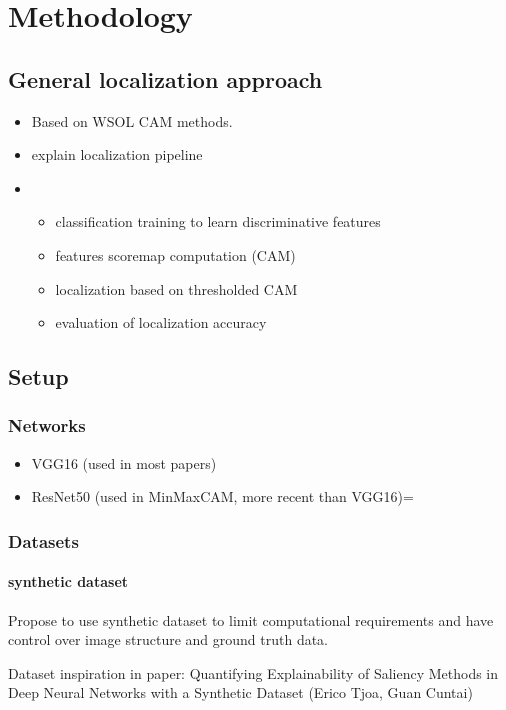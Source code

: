 \chapter{Methodology}

\section{General localization approach}
\begin{itemize}
    \item Based on WSOL CAM methods.
    \item explain localization pipeline
    \item  \begin{itemize}
        \item classification training to learn discriminative features
        \item features scoremap computation (CAM)
        \item localization based on thresholded CAM
        \item evaluation of localization accuracy 
    \end{itemize}
\end{itemize}

\section{Setup}

\subsection{Networks}
\begin{itemize}
    \item VGG16 (used in most papers)
    \item ResNet50 (used in MinMaxCAM, more recent than VGG16)=
\end{itemize}

\subsection{Datasets}
\subsubsection{synthetic dataset}
Propose to use synthetic dataset to limit computational requirements and have control over image structure and ground truth data.

Dataset inspiration in paper: Quantifying Explainability of Saliency Methods in Deep Neural Networks with a Synthetic Dataset (Erico Tjoa, Guan Cuntai)

